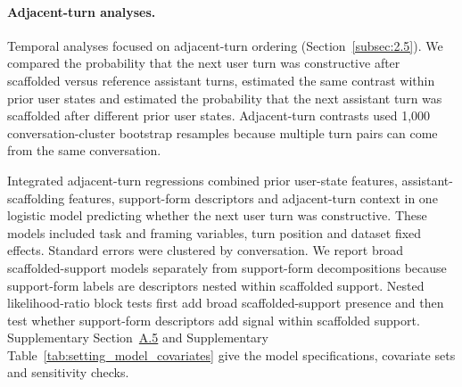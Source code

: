 \paragraph{Adjacent-turn analyses.}
Temporal analyses focused on adjacent-turn ordering (Section~\ref{subsec:2.5}). 
We compared the probability that the next user turn was constructive after scaffolded versus reference assistant turns, estimated the same contrast within prior user states and estimated the probability that the next assistant turn was scaffolded after different prior user states. Adjacent-turn contrasts used 1,000 conversation-cluster bootstrap resamples because multiple turn pairs can come from the same conversation.

Integrated adjacent-turn regressions combined prior user-state features, assistant-scaffolding features, support-form descriptors and adjacent-turn context in one logistic model predicting whether the next user turn was constructive. These models included task and framing variables, turn position and dataset fixed effects.
Standard errors were clustered by conversation. We report broad scaffolded-support models separately from support-form decompositions because support-form labels are descriptors nested within scaffolded support. Nested likelihood-ratio block tests first add broad scaffolded-support presence and then test whether support-form descriptors add signal within scaffolded support. Supplementary Section~\hyperref[supp:a5]{A.5} and Supplementary Table~\ref{tab:setting_model_covariates} give the model specifications, covariate sets and sensitivity checks.

